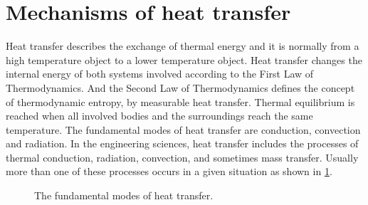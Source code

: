 \section{Mechanisms of heat transfer}
\noindent
Heat transfer describes the exchange of thermal energy and it is normally from a high temperature object to a lower temperature object.
Heat transfer changes the internal energy of both systems involved according to the First Law of Thermodynamics.
And the Second Law of Thermodynamics defines the concept of thermodynamic entropy, by measurable heat transfer.
Thermal equilibrium is reached when all involved bodies and the surroundings reach the same temperature.
The fundamental modes of heat transfer are conduction, convection and radiation.
In the engineering sciences, heat transfer includes the processes of thermal conduction, radiation, convection, and sometimes mass transfer.
Usually more than one of these processes occurs in a given situation as shown in \ref{Fig:HeatTransfer}.
\begin{figure}[!htp]
\centering{}
\caption{The fundamental modes of heat transfer.}
\label{Fig:HeatTransfer}
\end{figure}

